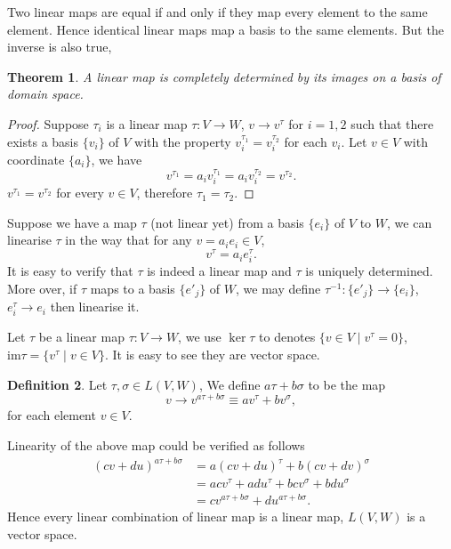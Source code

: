 \documentclass{amsbook}
\newtheorem{theorem}{Theorem}[chapter]
\theoremstyle{definition}
\newtheorem{definition}[theorem]{Definition}
\theoremstyle{remark}
\newcommand{\im}{\mathrm{im}}
\numberwithin{section}{chapter}
\numberwithin{equation}{chapter}
\begin{document}
Two linear maps are equal if and only if they map every element to the same element. Hence identical linear maps map a basis to the same elements. But the inverse is also true,
\begin{theorem}
	A linear map is completely determined by its images on a basis of domain space.
\end{theorem}
\begin{proof}
	Suppose $\tau_i$ is a linear map $\tau \colon V \to W$, $v \to v^\tau$ for $i = 1,2$ such that there exists a basis $\{v_i\}$ of $V$ with the property $v_i^{\tau_1} = v_i^{\tau_2}$ for each $v_i$. Let $v\in V$ with coordinate $\{a_i\}$, we have
	\begin{equation*}
		v^{\tau_1} = a_iv_i^{\tau_1} = a_iv_i^{\tau_2} = v^{\tau_2}.
	\end{equation*} 
	$v^{\tau_1} = v^{\tau_2}$ for every $v\in V$, therefore $\tau_1 = \tau_2$.
\end{proof}
Suppose we have a map $\tau$ (not linear yet) from a basis $\{e_i\}$ of $V$ to $W$, we can linearise $\tau$ in the way that for any $v = a_ie_i\in V$, 
\begin{equation*}
	v^{\tau} = a_ie_i^{\tau}.
\end{equation*}
It is easy to verify that $\tau$ is indeed a linear map and $\tau$ is uniquely determined. More over, if $\tau$ maps to a basis $\{e'_j\}$ of $W$, we may define $\tau^{-1} \colon \{e'_j\} \to \{e_i\}$, $e_i^\tau\to e_i$ then linearise it.

Let $\tau$ be a linear map $\tau \colon V\to W$, we use $\ker{\tau}$ to denotes $\{v\in V\mid v^\tau = 0\}$, $\im{\tau} = 
\{v^\tau\mid v\in V\}$. It is easy to see they are vector space.

\begin{definition}
	Let $\tau, \sigma\in L(V, W)$, We define $a\tau + b\sigma$ to be the map
	\begin{equation*}
	v \to v^{a\tau + b\sigma} \equiv av^{\tau} + bv^{\sigma},
	\end{equation*}
	for each element $v\in V$.
\end{definition}
Linearity of the above map could be verified as follows
 \begin{equation*}
 \begin{split}
 (cv + du)^{a\tau + b\sigma} 
 &= a(cv + du)^{\tau} + b(cv + dv)^{\sigma}\\ 
 &= acv^{\tau} + adu^{\tau} + bcv^\sigma + bdu^\sigma\\
 &= cv^{a\tau + b\sigma} + du^{a\tau + b\sigma}.
 \end{split}
 \end{equation*}
 Hence every linear combination of linear map is a linear map, $L(V, W)$ is a vector space.
\end{document}
